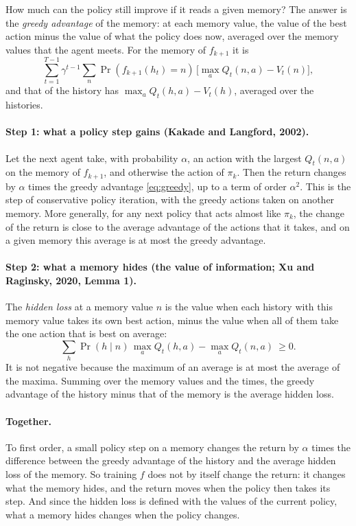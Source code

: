 \documentclass[11pt]{article}
\theoremstyle{definition}
\begin{document}
How much can the policy still improve if it reads a given memory? The answer is the \emph{greedy advantage} of the memory: at each memory value, the value of the best action minus the value of what the policy does now, averaged over the memory values that the agent meets. For the memory of $f_{k+1}$ it is
\begin{equation}\label{eq:greedy}
\sum_{t=1}^{T-1}\gamma^{t-1}\sum_n\Pr(f_{k+1}(h_t)=n)\,\big[\max_aQ_t(n,a)-V_t(n)\big],
\end{equation}
and that of the history has $\max_aQ_t(h,a)-V_t(h)$, averaged over the histories.

\paragraph{Step 1: what a policy step gains (Kakade and Langford, 2002).} Let the next agent take, with probability $\alpha$, an action with the largest $Q_t(n,a)$ on the memory of $f_{k+1}$, and otherwise the action of $\pi_k$. Then the return changes by $\alpha$ times the greedy advantage \eqref{eq:greedy}, up to a term of order $\alpha^2$. This is the step of conservative policy iteration, with the greedy actions taken on another memory. More generally, for any next policy that acts almost like $\pi_k$, the change of the return is close to the average advantage of the actions that it takes, and on a given memory this average is at most the greedy advantage.

\paragraph{Step 2: what a memory hides (the value of information; Xu and Raginsky, 2020, Lemma 1).} The \emph{hidden loss} at a memory value $n$ is the value when each history with this memory value takes its own best action, minus the value when all of them take the one action that is best on average:
\begin{equation}\label{eq:loss}
\sum_h\Pr(h\mid n)\,\max_aQ_t(h,a)-\max_aQ_t(n,a)\ \ge0 .
\end{equation}
It is not negative because the maximum of an average is at most the average of the maxima. Summing over the memory values and the times, the greedy advantage of the history minus that of the memory is the average hidden loss.

\paragraph{Together.} To first order, a small policy step on a memory changes the return by $\alpha$ times the difference between the greedy advantage of the history and the average hidden loss of the memory. So training $f$ does not by itself change the return: it changes what the memory hides, and the return moves when the policy then takes its step. And since the hidden loss is defined with the values of the current policy, what a memory hides changes when the policy changes.
\end{document}
